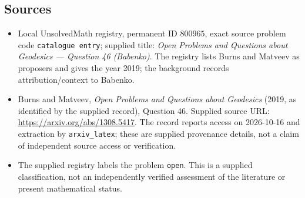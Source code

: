 \documentclass[11pt]{article}
\begin{document}
\subsection{Sources}
\begin{itemize}
\item Local UnsolvedMath registry, permanent ID \(800965\), exact source problem code \texttt{catalogue entry}; supplied title: \emph{Open Problems and Questions about Geodesics --- Question 46 (Babenko)}. The registry lists Burns and Matveev as proposers and gives the year 2019; the background records attribution/context to Babenko.
\item Burns and Matveev, \emph{Open Problems and Questions about Geodesics} (2019, as identified by the supplied record), Question 46. Supplied source URL: \url{https://arxiv.org/abs/1308.5417}. The record reports access on 2026-10-16 and extraction by \texttt{arxiv\_latex}; these are supplied provenance details, not a claim of independent source access or verification.
\item The supplied registry labels the problem \texttt{open}. This is a supplied classification, not an independently verified assessment of the literature or present mathematical status.
\end{itemize}
\end{document}
